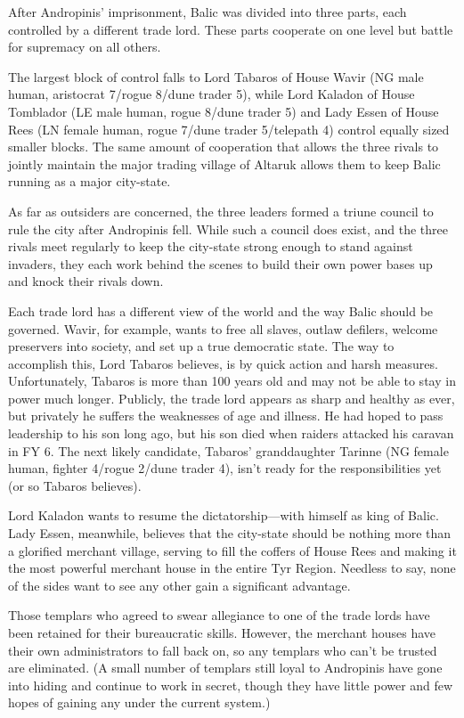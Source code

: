 {
	After Andropinis' imprisonment, Balic was divided into three parts, each controlled by a different trade lord. These parts cooperate on one level but battle for supremacy on all others.

	The largest block of control falls to Lord Tabaros of House Wavir (NG male human, aristocrat 7/rogue 8/dune trader 5), while Lord Kaladon of House Tomblador (LE male human, rogue 8/dune trader 5) and Lady Essen of House Rees (LN female human, rogue 7/dune trader 5/telepath 4) control equally sized smaller blocks. The same amount of cooperation that allows the three rivals to jointly maintain the major trading village of Altaruk allows them to keep Balic running as a major city-state.

	As far as outsiders are concerned, the three leaders formed a triune council to rule the city after Andropinis fell. While such a council does exist, and the three rivals meet regularly to keep the city-state strong enough to stand against invaders, they each work behind the scenes to build their own power bases up and knock their rivals down.

	Each trade lord has a different view of the world and the way Balic should be governed. Wavir, for example, wants to free all slaves, outlaw defilers, welcome preservers into society, and set up a true democratic state. The way to accomplish this, Lord Tabaros believes, is by quick action and harsh measures. Unfortunately, Tabaros is more than 100 years old and may not be able to stay in power much longer. Publicly, the trade lord appears as sharp and healthy as ever, but privately he suffers the weaknesses of age and illness. He had hoped to pass leadership to his son long ago, but his son died when raiders attacked his caravan in FY 6. The next likely candidate, Tabaros' granddaughter Tarinne (NG female human, fighter 4/rogue 2/dune trader 4), isn't ready for the responsibilities yet (or so Tabaros believes).

	Lord Kaladon wants to resume the dictatorship---with himself as king of Balic. Lady Essen, meanwhile, believes that the city-state should be nothing more than a glorified merchant village, serving to fill the coffers of House Rees and making it the most powerful merchant house in the entire Tyr Region. Needless to say, none of the sides want to see any other gain a significant advantage.

	Those templars who agreed to swear allegiance to one of the trade lords have been retained for their bureaucratic skills. However, the merchant houses have their own administrators to fall back on, so any templars who can't be trusted are eliminated. (A small number of templars still loyal to Andropinis have gone into hiding and continue to work in secret, though they have little power and few hopes of gaining any under the current system.)

}
